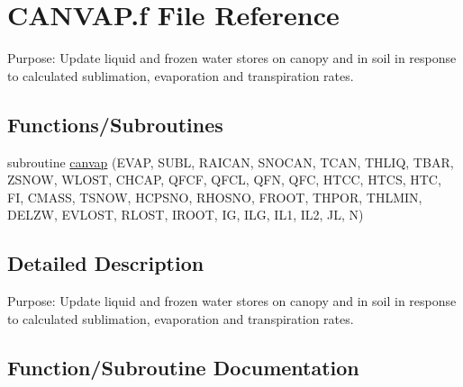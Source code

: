 \hypertarget{CANVAP_8f}{}\section{C\+A\+N\+V\+A\+P.\+f File Reference}
\label{CANVAP_8f}


Purpose\+: Update liquid and frozen water stores on canopy and in soil in response to calculated sublimation, evaporation and transpiration rates.  


\subsection*{Functions/\+Subroutines}
\begin{DoxyCompactItemize}
\item 
subroutine \hyperlink{CANVAP_8f_a3041cf9c21766306cba0e7bc1b00161f}{canvap} (E\+V\+A\+P, S\+U\+B\+L, R\+A\+I\+C\+A\+N, S\+N\+O\+C\+A\+N, T\+C\+A\+N, T\+H\+L\+I\+Q, T\+B\+A\+R, Z\+S\+N\+O\+W, W\+L\+O\+S\+T, C\+H\+C\+A\+P, Q\+F\+C\+F, Q\+F\+C\+L, Q\+F\+N, Q\+F\+C, H\+T\+C\+C, H\+T\+C\+S, H\+T\+C, F\+I, C\+M\+A\+S\+S, T\+S\+N\+O\+W, H\+C\+P\+S\+N\+O, R\+H\+O\+S\+N\+O, F\+R\+O\+O\+T, T\+H\+P\+O\+R, T\+H\+L\+M\+I\+N, D\+E\+L\+Z\+W, E\+V\+L\+O\+S\+T, R\+L\+O\+S\+T, I\+R\+O\+O\+T, I\+G, I\+L\+G, I\+L1, I\+L2, J\+L, N)
\end{DoxyCompactItemize}


\subsection{Detailed Description}
Purpose\+: Update liquid and frozen water stores on canopy and in soil in response to calculated sublimation, evaporation and transpiration rates. 



\subsection{Function/\+Subroutine Documentation}
\hypertarget{CANVAP_8f_a3041cf9c21766306cba0e7bc1b00161f}{}
